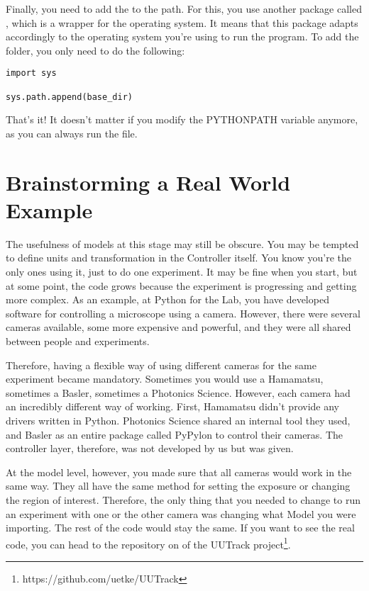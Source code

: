 Finally, you need to add the  to the path. For this, you use another package called , which is a wrapper for the operating system. It means that this package adapts accordingly to the operating system you're using to run the program. To add the folder, you only need to do the following:

\begin{verbatim}
import sys

sys.path.append(base_dir)
\end{verbatim}

That's it! It doesn't matter if you modify the PYTHONPATH variable anymore, as you can always run the  file.


\section{Brainstorming a Real World Example}\label{sec:real-world-model}
The usefulness of models at this stage may still be obscure. You may be tempted to define units and transformation in the Controller itself. You know you're the only ones using it, just to do one experiment. It may be fine when you start, but at some point, the code grows because the experiment is progressing and getting more complex. As an example, at Python for the Lab, you have developed software for controlling a microscope using a camera. However, there were several cameras available, some more expensive and powerful, and they were all shared between people and experiments.

Therefore, having a flexible way of using different cameras for the same experiment became mandatory. Sometimes you would use a Hamamatsu, sometimes a Basler, sometimes a Photonics Science. However, each camera had an incredibly different way of working. First, Hamamatsu didn't provide any drivers written in Python. Photonics Science shared an internal tool they used, and Basler as an entire package called PyPylon to control their cameras. The controller layer, therefore, was not developed by us but was given.

At the model level, however, you made sure that all cameras would work in the same way. They all have the same method for setting the exposure or changing the region of interest. Therefore, the only thing that you needed to change to run an experiment with one or the other camera was changing what Model you were importing. The rest of the code would stay the same. If you want to see the real code, you can head to the repository on of the UUTrack project\footnote{https://github.com/uetke/UUTrack}.

